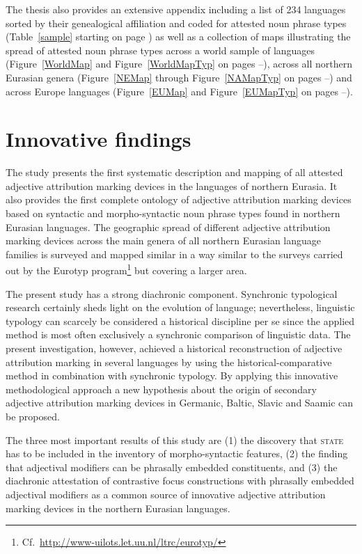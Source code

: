 \noindent The thesis also provides an extensive appendix including a list of 234 languages sorted by their genealogical affiliation and coded for attested noun phrase types (Table~\ref{sample} starting on page \pageref{sample}) as well as a collection of maps illustrating the spread of attested noun phrase types across a world sample of languages (Figure~\ref{WorldMap} and Figure~\ref{WorldMapTyp} on pages \pageref{WorldMap}–\pageref{WorldMapTyp}), across all northern Eurasian genera (Figure~\ref{NEMap} through Figure~\ref{NAMapTyp} on pages \pageref{NEMap}–\pageref{NAMapTyp}) and across Europe languages (Figure~\ref{EUMap} and Figure~\ref{EUMapTyp} on pages \pageref{EUMap}–\pageref{EUMapTyp}).

\section{Innovative findings}
The study presents the first systematic description and mapping of all attested adjective attribution marking devices in the languages of northern Eurasia. It also provides the first complete ontology of adjective attribution marking devices based on syntactic and morpho-syntactic noun phrase types found in northern Eurasian languages. The geographic spread of different adjective attribution marking devices across the main genera of all northern Eurasian language families is surveyed and mapped similar in a way similar to the surveys carried out by the Eurotyp program\footnote{Cf.~\url{http://www-uilots.let.uu.nl/ltrc/eurotyp/}} but covering a larger area. %

The present study has a strong diachronic component. Synchronic typological research certainly sheds light on the evolution of language; nevertheless, linguistic typology can scarcely be considered a historical discipline per se since the applied method is most often exclusively a synchronic comparison of linguistic data. The present investigation, however, achieved a historical reconstruction of adjective attribution marking in several languages by using the historical-comparative method in combination with synchronic typology. By applying this innovative methodological approach a new hypothesis about the origin of secondary adjective attribution marking devices in Germanic, Baltic, Slavic and Saamic can be proposed. 

The three most important results of this study are (1) the discovery that \textsc{state} has to be included in the inventory of morpho-syntactic features, (2) the finding that adjectival modifiers can be phrasally embedded constituents, and (3) the diachronic attestation of contrastive focus constructions with phrasally embedded adjectival modifiers as a common source of innovative adjective attribution marking devices in the northern Eurasian languages.

